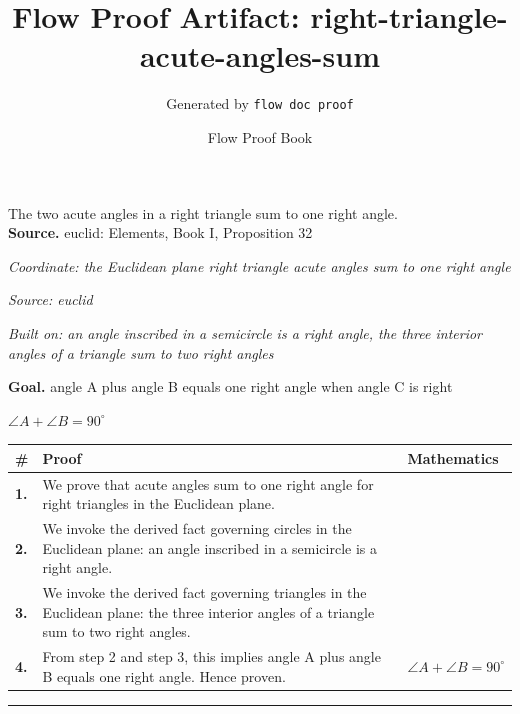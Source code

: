 \documentclass[11pt]{article}
\title{Flow Proof Artifact: right-triangle-acute-angles-sum}
\author{Generated by \texttt{flow doc proof}}
\date{Flow Proof Book}
\theoremstyle{definition}
\begin{document}
\maketitle
The two acute angles in a right triangle sum to one right angle.\\[0.5em]
\textbf{Source.} euclid: Elements, Book I, Proposition 32\\[0.5em]
\bigskip
{}\par
\smallskip\noindent\textit{Coordinate: the Euclidean plane \cdot right triangle \cdot acute angles sum to one right angle}\par
\smallskip\noindent\textit{Source: euclid}\par
\smallskip\noindent\textit{Built on: an angle inscribed in a semicircle is a right angle, the three interior angles of a triangle sum to two right angles}\par
\medskip
\noindent\textbf{Goal.} angle A plus angle B equals one right angle when angle C is right\par
\noindent$\displaystyle \angle A + \angle B = 90^\circ$\par
\medskip
\noindent
\begin{tabular}{@{} >{\raggedright\arraybackslash}p{} >{\raggedright\arraybackslash}p{} >{\raggedleft\arraybackslash}p{} @{}}
\textbf{\#} & \textbf{Proof} & \textbf{Mathematics} \\
\midrule
\textbf{1.} & We prove that acute angles sum to one right angle for right triangles in the Euclidean plane. & \\[0.45em]
\textbf{2.} & We invoke the derived fact governing circles in the Euclidean plane: an angle inscribed in a semicircle is a right angle. & \\[0.45em]
\textbf{3.} & We invoke the derived fact governing triangles in the Euclidean plane: the three interior angles of a triangle sum to two right angles. & \\[0.45em]
\textbf{4.} & From step 2 and step 3, this implies angle A plus angle B equals one right angle. Hence proven. & $\displaystyle \angle A + \angle B = 90^\circ$ \\[0.45em]
\bottomrule
\end{tabular}
\label{thm:Geometry-right triangle-acute_angles_sum_to_one_right_angle}
\par\medskip\hrule
\end{document}
